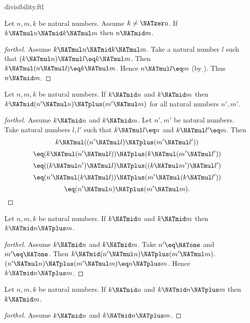 \documentclass{naproche-library}
\begin{document}
\begin{smodule}[title=Divisibility]{divisibility.ftl}
\begin{proposition}[forthel,id=ARITHMETIC_07_6469492028735488]
  Let $n, m, k$ be natural numbers.
  Assume $k \neq \NATzero$.
  If $k \NATmul n \NATmid k \NATmul m$ then $n \NATmid m$.
\end{proposition}
\begin{proof}[forthel]
  Assume $k \NATmul n \NATmid k \NATmul m$.
  Take a natural number $l$ such that $(k \NATmul n) \NATmul l \eq k \NATmul m$.
  Then $k \NATmul (n \NATmul l) \eq k \NATmul m$.
  Hence $n \NATmul l \eq m$ (by ).
  Thus $n \NATmid m$.
\end{proof}

\begin{proposition}[forthel,id=ARITHMETIC_07_4700711333920768]
  Let $n, m, k$ be natural numbers.
  If $k \NATmid n$ and $k \NATmid m$ then $k \NATmid (n' \NATmul n) \NATplus (m' \NATmul m)$
  for all natural numbers $n', m'$.
\end{proposition}
\begin{proof}[forthel]
  Assume $k \NATmid n$ and $k \NATmid m$.
  Let $n', m'$ be natural numbers.
  Take natural numbers $l,l'$ such that $k \NATmul l \eq n$ and $k \NATmul l' \eq m$.
  Then
  \[  k \NATmul ((n' \NATmul l) \NATplus (m' \NATmul l'))                \]
  \[    \eq (k \NATmul (n' \NATmul l)) \NATplus (k \NATmul (m' \NATmul l'))  \]
  \[    \eq ((k \NATmul n') \NATmul l) \NATplus ((k \NATmul m') \NATmul l')  \]
  \[    \eq (n' \NATmul (k \NATmul l)) \NATplus (m' \NATmul (k \NATmul l'))  \]
  \[    \eq (n' \NATmul n) \NATplus (m' \NATmul m).                      \]
\end{proof}

\begin{corollary}[forthel,id=ARITHMETIC_07_1556786209357824]
  Let $n, m, k$ be natural numbers.
  If $k \NATmid n$ and $k \NATmid m$ then $k \NATmid n \NATplus m$.
\end{corollary}
\begin{proof}[forthel]
  Assume $k \NATmid n$ and $k \NATmid m$.
  Take $n' \eq \NATone$ and $m' \eq \NATone$.
  Then $k \NATmid (n' \NATmul n) \NATplus (m' \NATmul m)$.
  $(n' \NATmul n) \NATplus (m' \NATmul m) \eq n \NATplus m$.
  Hence $k \NATmid n \NATplus m$.
\end{proof}

\begin{proposition}[forthel,id=ARITHMETIC_07_1076947887063040]
  Let $n, m, k$ be natural numbers.
  If $k \NATmid n$ and $k \NATmid n \NATplus m$ then $k \NATmid m$.
\end{proposition}
\begin{proof}[forthel]
  Assume $k \NATmid n$ and $k \NATmid n \NATplus m$.


\end{proof}
\end{smodule}
\end{document}

